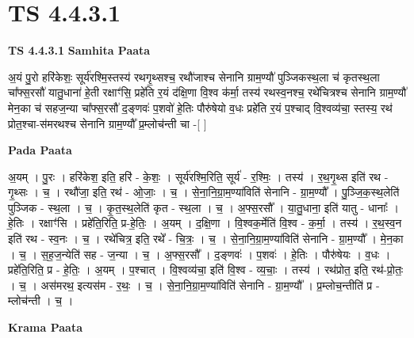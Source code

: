 \documentclass[17pt]{extarticle}
\begin{document}
\section{ TS 4.4.3.1 }

\textbf{TS 4.4.3.1 } \newline
\textbf{Samhita Paata} \newline

अ॒यं पु॒रो हरि॑केशः॒ सूर्य॑रश्मि॒स्तस्य॑ रथगृ॒थ्सश्च॒ रथौ॑जाश्च सेनानि ग्राम॒ण्यौ॑ पुञ्जिकस्थ॒ला च॑ कृतस्थ॒ला चा᳚फ्स॒रसौ॑ यातु॒धाना॑ हे॒ती रक्षाꣳ॑सि॒ प्रहे॑ति र॒यं द॑क्षि॒णा वि॒श्व क॑र्मा॒ तस्य॑ रथस्व॒नश्च॒ रथे॑चित्रश्च सेनानि ग्राम॒ण्यौ॑ मेन॒का च॑ सहज॒न्या चा᳚फ्स॒रसौ॑ द॒ङ्णवः॑ प॒शवो॑ हे॒तिः पौरु॑षेयो व॒धः प्रहे॑ति र॒यं प॒श्चाद् वि॒श्वव्य॑चा॒ स्तस्य॒ रथ॑ प्रोत॒श्चा-स॑मरथश्च सेनानि ग्राम॒ण्यौ᳚ प्र॒म्लोच॑न्ती चा -[  ] \newline

\textbf{Pada Paata} \newline

अ॒यम् । पु॒रः । हरि॑केश॒ इति॒ हरि॑ - के॒शः॒ । सूर्य॑रश्मि॒रिति॒ सूर्य॑ - र॒श्मिः॒ । तस्य॑ । र॒थ॒गृ॒थ्स इति॑ रथ - गृ॒थ्सः । च॒ । रथौ॑जा॒ इति॒ रथ॑ - ओ॒जाः॒ । च॒ । से॒ना॒नि॒ग्रा॒म॒ण्या॑विति॑ सेनानि - ग्रा॒म॒ण्यौ᳚ । पु॒ञ्जि॒क॒स्थ॒लेति॑ पुञ्जिक - स्थ॒ला । च॒ । कृ॒त॒स्थ॒लेति॑ कृत - स्थ॒ला । च॒ । अ॒फ्स॒रसौ᳚ । या॒तु॒धाना॒ इति॑ यातु - धानाः᳚ । हे॒तिः । रक्षाꣳ॑सि । प्रहे॑ति॒रिति॒ प्र-हे॒तिः॒ । अ॒यम् । द॒क्षि॒णा । वि॒श्वक॒र्मेति॑ वि॒श्व - क॒र्मा॒ । तस्य॑ । र॒थ॒स्व॒न इति॑ रथ - स्व॒नः । च॒ । रथे॑चित्र॒ इति॒ रथे᳚ - चि॒त्रः॒ । च॒ । से॒ना॒नि॒ग्रा॒म॒ण्या॑विति॑ सेनानि - ग्रा॒म॒ण्यौ᳚ । मे॒न॒का । च॒ । स॒ह॒ज॒न्येति॑ सह - ज॒न्या । च॒ । अ॒फ्स॒रसौ᳚ । द॒ङ्णवः॑ । प॒शवः॑ । हे॒तिः । पौरु॑षेयः । व॒धः । प्रहे॑ति॒रिति॒ प्र - हे॒तिः॒ । अ॒यम् । प॒श्चात् । वि॒श्वव्य॑चा॒ इति॑ वि॒श्व - व्य॒चाः॒ । तस्य॑ । रथ॑प्रोत॒ इति॒ रथ॑-प्रो॒तः॒ । च॒ । अस॑मरथ॒ इत्यस॑म - र॒थः॒ । च॒ । से॒ना॒नि॒ग्रा॒म॒ण्या॑विति॑ सेनानि - ग्रा॒म॒ण्यौ᳚ । प्र॒म्लोच॒न्तीति॑ प्र - म्लोच॑न्ती । च॒ ।  \newline


\textbf{Krama Paata} \newline
\end{document}
